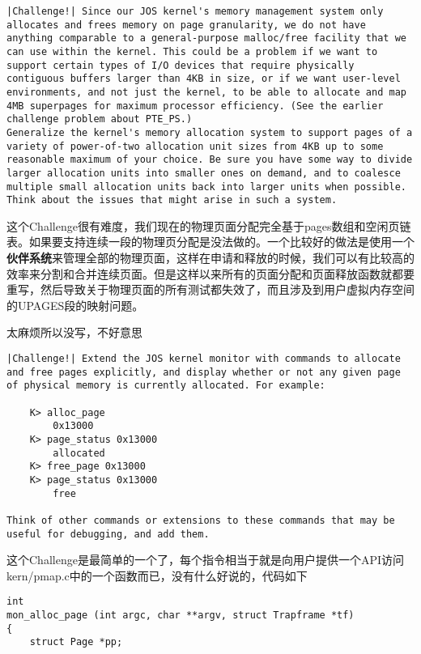 \documentclass{article}
\newcommand{\highlight}[1]{{\bfseries \color{red}  #1}}
\begin{document}
\begin{CJK*}{UTF8}{gkai}
\begin{lstlisting}[style=challenge]
|Challenge!| Since our JOS kernel's memory management system only allocates and frees memory on page granularity, we do not have anything comparable to a general-purpose malloc/free facility that we can use within the kernel. This could be a problem if we want to support certain types of I/O devices that require physically contiguous buffers larger than 4KB in size, or if we want user-level environments, and not just the kernel, to be able to allocate and map 4MB superpages for maximum processor efficiency. (See the earlier challenge problem about PTE_PS.)
Generalize the kernel's memory allocation system to support pages of a variety of power-of-two allocation unit sizes from 4KB up to some reasonable maximum of your choice. Be sure you have some way to divide larger allocation units into smaller ones on demand, and to coalesce multiple small allocation units back into larger units when possible. Think about the issues that might arise in such a system.
\end{lstlisting}

这个Challenge很有难度，我们现在的物理页面分配完全基于pages数组和空闲页链表。如果要支持连续一段的物理页分配是没法做的。一个比较好的做法是使用一个\highlight{伙伴系统}来管理全部的物理页面，这样在申请和释放的时候，我们可以有比较高的效率来分割和合并连续页面。但是这样以来所有的页面分配和页面释放函数就都要重写，然后导致关于物理页面的所有测试都失效了，而且涉及到用户虚拟内存空间的UPAGES段的映射问题。

太麻烦所以没写，不好意思

\vspace{4em}

\begin{lstlisting}[style=challenge]
|Challenge!| Extend the JOS kernel monitor with commands to allocate and free pages explicitly, and display whether or not any given page of physical memory is currently allocated. For example:

	K> alloc_page
		0x13000
	K> page_status 0x13000
		allocated
	K> free_page 0x13000
	K> page_status 0x13000
		free
	
Think of other commands or extensions to these commands that may be useful for debugging, and add them.
\end{lstlisting}

这个Challenge是最简单的一个了，每个指令相当于就是向用户提供一个API访问kern/pmap.c中的一个函数而已，没有什么好说的，代码如下

\begin{lstlisting}[style=ccode, title={\scriptsize \ttfamily \bfseries kern/monitor.c}]
int 
mon_alloc_page (int argc, char **argv, struct Trapframe *tf)
{
    struct Page *pp;


\end{lstlisting}
\end{CJK*}
\end{document}
